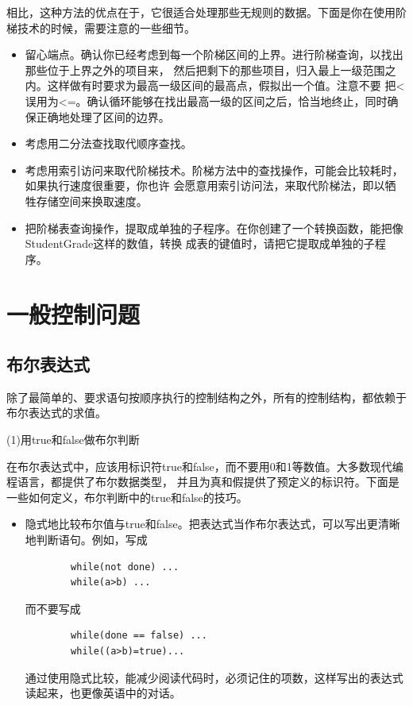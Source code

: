 \documentclass{article}
\begin{document}
相比，这种方法的优点在于，它很适合处理那些无规则的数据。下面是你在使用阶梯技术的时候，需要注意的一些细节。
\begin{itemize}
    \item 留心端点。确认你已经考虑到每一个阶梯区间的上界。进行阶梯查询，以找出那些位于上界之外的项目来，
    然后把剩下的那些项目，归入最上一级范围之内。这样做有时要求为最高一级区间的最高点，假拟出一个值。注意不要
    把<误用为<=。确认循环能够在找出最高一级的区间之后，恰当地终止，同时确保正确地处理了区间的边界。
    \item 考虑用二分法查找取代顺序查找。
    \item 考虑用索引访问来取代阶梯技术。阶梯方法中的查找操作，可能会比较耗时，如果执行速度很重要，你也许
    会愿意用索引访问法，来取代阶梯法，即以牺牲存储空间来换取速度。
    \item 把阶梯表查询操作，提取成单独的子程序。在你创建了一个转换函数，能把像StudentGrade这样的数值，转换
    成表的键值时，请把它提取成单独的子程序。
\end{itemize}

\section{一般控制问题}
\subsection{布尔表达式}
除了最简单的、要求语句按顺序执行的控制结构之外，所有的控制结构，都依赖于布尔表达式的求值。
\par
(1)用true和false做布尔判断
\par
在布尔表达式中，应该用标识符true和false，而不要用0和1等数值。大多数现代编程语言，都提供了布尔数据类型，
并且为真和假提供了预定义的标识符。下面是一些如何定义，布尔判断中的true和false的技巧。
\begin{itemize}
    \item 隐式地比较布尔值与true和false。把表达式当作布尔表达式，可以写出更清晰地判断语句。例如，写成
    \begin{lstlisting}
        while(not done) ...
        while(a>b) ...
    \end{lstlisting}
    而不要写成
    \begin{lstlisting}
        while(done == false) ...
        while((a>b)=true)...
    \end{lstlisting}
    通过使用隐式比较，能减少阅读代码时，必须记住的项数，这样写出的表达式读起来，也更像英语中的对话。
\end{itemize}
\end{document}
